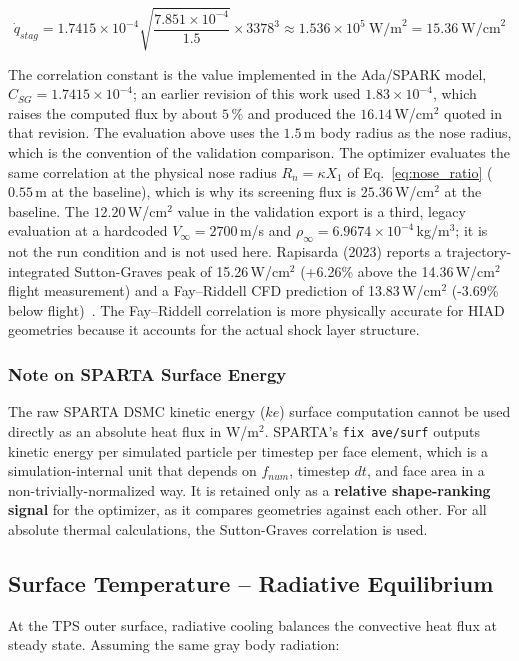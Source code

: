 \begin{equation}
    \dot{q}_{stag} = 1.7415 \times 10^{-4} \sqrt{\frac{7.851 \times 10^{-4}}{1.5}} \times 3378^3 \approx 1.536 \times 10^{5} \ \text{W/m}^2 = 15.36 \ \text{W/cm}^2
\end{equation}

The correlation constant is the value implemented in the Ada/SPARK model, $C_{SG} = 1.7415 \times 10^{-4}$; an earlier revision of this work used $1.83 \times 10^{-4}$, which raises the computed flux by about $5\,\%$ and produced the $16.14$\,W/cm$^2$ quoted in that revision. The evaluation above uses the $1.5$\,m body radius as the nose radius, which is the convention of the validation comparison. The optimizer evaluates the same correlation at the physical nose radius $R_n=\kappa X_1$ of Eq.~\eqref{eq:nose_ratio} ($0.55$\,m at the baseline), which is why its screening flux is $25.36$\,W/cm$^2$ at the baseline. The $12.20$\,W/cm$^2$ value in the validation export is a third, legacy evaluation at a hardcoded $V_{\infty} = 2700$\,m/s and $\rho_{\infty} = 6.9674 \times 10^{-4}$\,kg/m$^3$; it is not the run condition and is not used here. Rapisarda (2023) reports a trajectory-integrated Sutton-Graves peak of 15.26\,W/cm$^2$ (+6.26\% above the 14.36\,W/cm$^2$ flight measurement) and a Fay--Riddell CFD prediction of 13.83\,W/cm$^2$ (-3.69\% below flight)~\cite{rapisarda2023mdao}. The Fay--Riddell correlation is more physically accurate for HIAD geometries because it accounts for the actual shock layer structure.

\subsubsection*{Note on SPARTA Surface Energy}
The raw SPARTA DSMC kinetic energy ($ke$) surface computation cannot be used directly as an absolute heat flux in W/m$^2$. SPARTA's \texttt{fix ave/surf} outputs kinetic energy per simulated particle per timestep per face element, which is a simulation-internal unit that depends on $f_{num}$, timestep $dt$, and face area in a non-trivially-normalized way. It is retained only as a \textbf{relative shape-ranking signal} for the optimizer, as it compares geometries against each other. For all absolute thermal calculations, the Sutton-Graves correlation is used.

\subsection{Surface Temperature -- Radiative Equilibrium}
At the TPS outer surface, radiative cooling balances the convective heat flux at steady state. Assuming the same gray body radiation:

